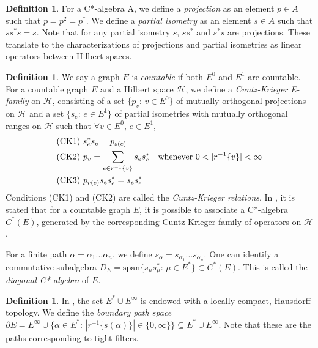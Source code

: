 \documentclass[12pt]{article}
\theoremstyle{definition}
\newtheorem{definition}[theorem]{Definition}
\begin{document}
\begin{definition}
    For a C*-algebra A, we define a \emph{projection} as an element $p \in A$
    such that $p = p^2 = p^*$. We define a \emph{partial isometry} as an element
    $s \in A$ such that $ss^*s = s$. Note that for any partial isometry $s$, 
    $ss^*$ and $s^*s$ are projections. These translate to the characterizations of
    projections and partial isometries as linear operators between Hilbert spaces.
\end{definition}

\begin{definition} \parencite[Chapter 5]{raeburn}
    We say a graph $E$ is \emph{countable} if both $E^0$ and $E^1$ are countable.
    For a countable graph $E$ and a Hilbert space $\mathcal{H}$, we define
    a \emph{Cuntz-Krieger E-family} on $\mathcal{H}$, consisting of a set 
    $\{p_v\text{: } v \in E^0\}$ of mutually orthogonal projections on $\mathcal{H}$
    and a set $\{s_e\text{: } e \in E^1\}$ of partial isometries with mutually orthogonal ranges
    on $\mathcal{H}$ such that $\forall v \in E^0$, $e \in E^1$,
    \begin{align*}
        &\text{(CK1) } s_e^* s_e = p_{s(e)} \\
        &\text{(CK2) } p_v = \sum_{e \in r^{-1}\{v\}} s_e s_e^* \text{\quad whenever } 0 < |r^{-1}\{v\}| < \infty \\
        &\text{(CK3) } p_{r(e)} s_e s_e^* = s_e s_e^*
    \end{align*}
    Conditions (CK1) and (CK2) are called the \emph{Cuntz-Krieger relations}.
    In \parencite[Definition 1]{infgraphs}, it is stated that for a countable graph $E$, 
    it is possible to associate a C*-algebra $C^*(E)$, generated by the corresponding Cuntz-Krieger
    family of operators on $\mathcal{H}$.
\end{definition} 
For a finite path $\alpha = \alpha_1 ... \alpha_n$, we define $s_\alpha = s_{\alpha_1} ... s_{\alpha_n}$.
One can identify a commutative subalgebra $D_E = \overline{\text{span}}\{s_\mu s_\mu^*\text{: } \mu \in E^*\} \subset C^*(E)$.
This is called the \emph{diagonal C*-algebra} of $E$.

\begin{definition}
    In \cite[Theorem 2.1]{webster}, the set $E^* \cup E^\infty$ is endowed with
    a locally compact, Hausdorff topology. We define the \emph{boundary path space}
    $\partial E = E^\infty \cup \{\alpha \in E^*\text{: } |r^{-1}\{s(\alpha)\}| \in \{0, \infty\}\} \subseteq E^* \cup E^\infty$.
    Note that these are the paths corresponding to tight filters.
\end{definition}
\end{document}
